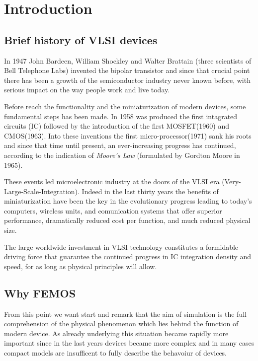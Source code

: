\chapter{Introduction}
\section{Brief history of VLSI devices}


In 1947 John Bardeen, William Shockley and Walter Brattain (three scientists of Bell Telephone Labs) invented the bipolar transistor and since that crucial point there has been a growth  of the semiconductor industry never known before, with serious impact on the way people work and live today. 

Before reach the functionality and the miniaturization of modern devices, some fundamental steps has been made.
In 1958 was produced the first intagrated circuits (IC)  followed by the introduction of the first MOSFET(1960) and CMOS(1963). Into these inventions the first micro-processor(1971) sank his roots  and since that time until present, an ever-increasing progress has continued, according to the indication of \textit{Moore's Law} (formulated by Gordton Moore in 1965).

These events led microelectronic industry at the doors of the VLSI era (Very-Large-Scale-Integration). Indeed in the last thirty years the benefits of miniaturization have been the key in the evolutionary progress leading to today's computers, wireless units, and comunication systems that offer superior performance, dramatically reduced cost per function, and much reduced physical size.

The large worldwide investment in VLSI technology constitutes a formidable driving force that guarantee the continued progress in IC integration density and speed, for as long as physical principles will allow.

\section{Why FEMOS}

From this point we want start and remark that the aim of simulation
is the full comprehension of the physical phenomenon which lies behind the function of modern device. As already underlying this situation became rapidly more important since in the last years devices became more complex and in many cases compact models are insufficent to fully describe the behavoiur of devices.

